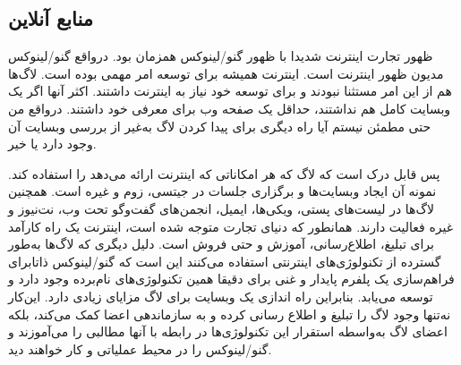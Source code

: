 \subsection{منابع آنلاین}

ظهور تجارت اینترنت شدیدا با ظهور گنو/لینوکس همزمان بود. درواقع
گنو/لینوکس مدیون ظهور اینترنت است. اینترنت همیشه برای توسعه امر مهمی بوده است.
لاگ‌ها هم از این امر مستثنا نبودند و برای توسعه خود نیاز به اینترنت داشتند.
اکثر آنها اگر یک وبسایت کامل هم نداشتند، حداقل یک صفحه وب برای معرفی خود داشتند.
درواقع من حتی مطمئن نیستم آیا راه دیگری برای پیدا کردن لاگ به‌غیر از بررسی وبسایت
آن وجود دارد یا خیر.

پس قابل درک است که لاگ که هر امکاناتی که اینترنت ارائه می‌دهد را استفاده کند.
نمونه آن ایجاد وبسایت‌ها و برگزاری جلسات در جیتسی، زوم و غیره است.
همچنین لاگ‌ها در لیست‌های پستی، ویکی‌ها، ایمیل، انجمن‌های گفت‌وگو تحت وب، نت‌نیوز و غیره
فعالیت دارند.
همانطور که دنیای تجارت متوجه شده است، اینترنت یک راه کارآمد برای تبلیغ، اطلاع‌رسانی،
آموزش و حتی فروش است.
دلیل دیگری که لاگ‌ها به‌طور گسترده از تکنولوژی‌های اینترنتی استفاده می‌کنند این است که
گنو/لینوکس ذاتابرای فراهم‌سازی یک پلفرم پایدار و غنی برای
دقیقا همین تکنولوژی‌های نام‌برده وجود دارد و توسعه می‌یابد.
بنابراین راه اندازی یک وبسایت برای لاگ مزایای زیادی دارد. این‌کار نه‌تنها وجود لاگ را
تبلیغ و اطلاع رسانی کرده و به سازماندهی اعضا کمک می‌کند، بلکه اعضای لاگ به‌واسطه
استقرار این تکنولوژی‌ها در رابطه با آنها مطالبی را می‌آموزند و گنو/لینوکس را در محیط
عملیاتی و کار خواهند دید.

